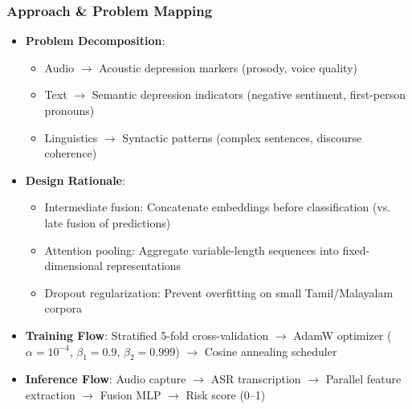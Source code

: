 \documentclass{beamer}
\begin{document}
\begin{frame}
\frametitle{Approach \& Problem Mapping}
\begin{itemize}
    \item \textbf{Problem Decomposition}:
    \begin{itemize}
        \item Audio $\rightarrow$ Acoustic depression markers (prosody, voice quality)
        \item Text $\rightarrow$ Semantic depression indicators (negative sentiment, first-person pronouns)
        \item Linguistics $\rightarrow$ Syntactic patterns (complex sentences, discourse coherence)
    \end{itemize}
    \item \textbf{Design Rationale}:
    \begin{itemize}
        \item Intermediate fusion: Concatenate embeddings before classification (vs. late fusion of predictions)
        \item Attention pooling: Aggregate variable-length sequences into fixed-dimensional representations
        \item Dropout regularization: Prevent overfitting on small Tamil/Malayalam corpora
    \end{itemize}
    \item \textbf{Training Flow}: Stratified 5-fold cross-validation $\rightarrow$ AdamW optimizer ($\alpha=10^{-4}$, $\beta_1=0.9$, $\beta_2=0.999$) $\rightarrow$ Cosine annealing scheduler
    \item \textbf{Inference Flow}: Audio capture $\rightarrow$ ASR transcription $\rightarrow$ Parallel feature extraction $\rightarrow$ Fusion MLP $\rightarrow$ Risk score (0--1)
\end{itemize}
\end{frame}
\end{document}
